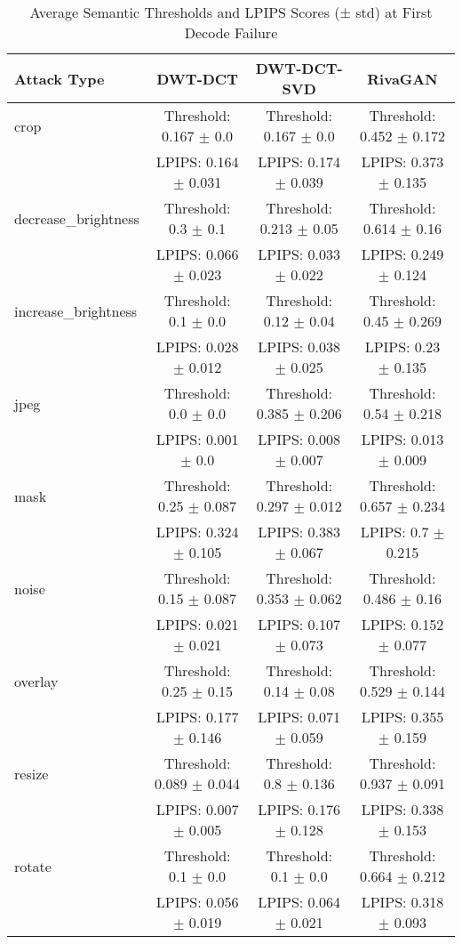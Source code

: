 \begin{table}[ht]
\centering
\caption{Average Semantic Thresholds and LPIPS Scores (± std) at First Decode Failure}
\label{tab:avg_normalized_threshold_lpips}
\renewcommand{\arraystretch}{1.2}
\begin{tabular}{|l|c|c|c|}
\hline
\textbf{Attack Type} & \textbf{DWT-DCT} & \textbf{DWT-DCT-SVD} & \textbf{RivaGAN} \\
\hline
crop & Threshold: 0.167 $\pm$ 0.0 & Threshold: 0.167 $\pm$ 0.0 & Threshold: 0.452 $\pm$ 0.172 \\
 & LPIPS: 0.164 $\pm$ 0.031 & LPIPS: 0.174 $\pm$ 0.039 & LPIPS: 0.373 $\pm$ 0.135 \\
\hline
decrease_brightness & Threshold: 0.3 $\pm$ 0.1 & Threshold: 0.213 $\pm$ 0.05 & Threshold: 0.614 $\pm$ 0.16 \\
 & LPIPS: 0.066 $\pm$ 0.023 & LPIPS: 0.033 $\pm$ 0.022 & LPIPS: 0.249 $\pm$ 0.124 \\
\hline
increase_brightness & Threshold: 0.1 $\pm$ 0.0 & Threshold: 0.12 $\pm$ 0.04 & Threshold: 0.45 $\pm$ 0.269 \\
 & LPIPS: 0.028 $\pm$ 0.012 & LPIPS: 0.038 $\pm$ 0.025 & LPIPS: 0.23 $\pm$ 0.135 \\
\hline
jpeg & Threshold: 0.0 $\pm$ 0.0 & Threshold: 0.385 $\pm$ 0.206 & Threshold: 0.54 $\pm$ 0.218 \\
 & LPIPS: 0.001 $\pm$ 0.0 & LPIPS: 0.008 $\pm$ 0.007 & LPIPS: 0.013 $\pm$ 0.009 \\
\hline
mask & Threshold: 0.25 $\pm$ 0.087 & Threshold: 0.297 $\pm$ 0.012 & Threshold: 0.657 $\pm$ 0.234 \\
 & LPIPS: 0.324 $\pm$ 0.105 & LPIPS: 0.383 $\pm$ 0.067 & LPIPS: 0.7 $\pm$ 0.215 \\
\hline
noise & Threshold: 0.15 $\pm$ 0.087 & Threshold: 0.353 $\pm$ 0.062 & Threshold: 0.486 $\pm$ 0.16 \\
 & LPIPS: 0.021 $\pm$ 0.021 & LPIPS: 0.107 $\pm$ 0.073 & LPIPS: 0.152 $\pm$ 0.077 \\
\hline
overlay & Threshold: 0.25 $\pm$ 0.15 & Threshold: 0.14 $\pm$ 0.08 & Threshold: 0.529 $\pm$ 0.144 \\
 & LPIPS: 0.177 $\pm$ 0.146 & LPIPS: 0.071 $\pm$ 0.059 & LPIPS: 0.355 $\pm$ 0.159 \\
\hline
resize & Threshold: 0.089 $\pm$ 0.044 & Threshold: 0.8 $\pm$ 0.136 & Threshold: 0.937 $\pm$ 0.091 \\
 & LPIPS: 0.007 $\pm$ 0.005 & LPIPS: 0.176 $\pm$ 0.128 & LPIPS: 0.338 $\pm$ 0.153 \\
\hline
rotate & Threshold: 0.1 $\pm$ 0.0 & Threshold: 0.1 $\pm$ 0.0 & Threshold: 0.664 $\pm$ 0.212 \\
 & LPIPS: 0.056 $\pm$ 0.019 & LPIPS: 0.064 $\pm$ 0.021 & LPIPS: 0.318 $\pm$ 0.093 \\
\hline
\end{tabular}
\end{table}